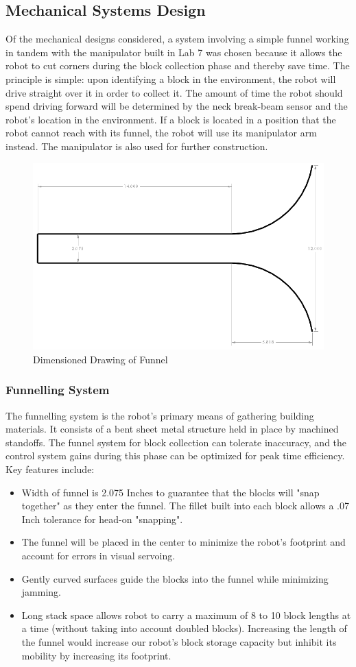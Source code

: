 \documentclass[letterpaper,11pt]{article}
\begin{document}
\subsection{Mechanical Systems Design}
Of the mechanical designs considered, a system involving a simple funnel working in tandem with the manipulator built in Lab 7 was chosen because it allows the robot to cut corners during the block collection phase and thereby save time. The principle is simple: upon identifying a block in the environment, the robot will drive straight over it in order to collect it. The amount of time the robot should spend driving forward will be determined by the neck break-beam sensor and the robot's location in the environment. If a block is located in a position that the robot cannot reach with its funnel, the robot will use its manipulator arm instead. The manipulator is also used for further construction.
\begin{figure}[h]
 \centering
  \includegraphics[width=4.5in]{images/Funnel}
\caption{Dimensioned Drawing of Funnel}
\label{fig:dimensioned}
\end{figure}
\subsubsection{Funnelling System}
The funnelling system is the robot's primary means of gathering building materials. It consists of a bent sheet metal structure held in place by machined standoffs. The funnel system for block collection can tolerate inaccuracy, and the control system gains during this phase can be optimized for peak time efficiency.
Key features include:
\begin{itemize}
\item Width of funnel is 2.075 Inches to guarantee that the blocks will "snap together" as they enter the funnel. The fillet built into each block allows a .07 Inch tolerance for head-on "snapping".
\item The funnel will be placed in the center to minimize the robot's footprint and account for errors in visual servoing. 
\item Gently curved surfaces guide the blocks into the funnel while minimizing jamming. 
\item Long stack space allows robot to carry a maximum of 8 to 10 block lengths at a time (without taking into account doubled blocks). Increasing the length of the funnel would increase our robot's block storage capacity but inhibit its mobility by increasing its footprint.
\end{itemize}
\end{document}

